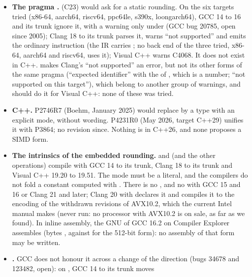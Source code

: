 \begin{itemize}
\item[$\bullet$] \textbf{The pragma .}
 (C23) would ask for a static rounding. On
the six targets tried (x86-64, aarch64, riscv64, ppc64le, s390x,
loongarch64), GCC 14 to 16 and its trunk ignore it, with a warning only
under  (GCC bug 20785, open since 2005); Clang 18 to its trunk
parses it, warns ``not supported'' and emits the ordinary instruction (the
IR carries ; no back end of the three tried, x86-64,
aarch64 and riscv64, uses it); Visual C++ warns C4068. It does not exist in
C++.  makes Clang's ``not supported'' an
error, but not its other forms of the same pragma (``expected identifier''
with the  of , which is a number; ``not
supported on this target''), which belong to another group of warnings, and
 should do it for Visual C++: none of these was tried.
\item[$\bullet$] \textbf{C++.} P2746R7 (Boehm, January 2025) would replace
 by a type with an explicit mode, without wording. P4231R0
(May 2026, target C++29) unifies it with P3864; no revision since. Nothing
is in C++26, and none proposes a SIMD form.
\item[$\bullet$] \textbf{The intrinsics of the embedded rounding.}
 and  (and the
other operations) compile with GCC 14 to its trunk, Clang 18 to its trunk
and Visual C++ 19.20 to 19.51. The mode must be a literal, and the compilers
do not fold a constant computed with . There is no
, and no  with GCC
15 and 16 or Clang 21 and later; Clang 20 with  declares
it and compiles it to the encoding of the withdrawn revisions of AVX10.2,
which the current Intel manual makes  (never run: no processor
with AVX10.2 is on sale, as far as we found). In inline assembly, the GNU
 of GCC 16.2 on Compiler Explorer assembles
 (bytes
, against  for the 512-bit
form): no assembly of that form may be written.
\item[$\bullet$] \textbf{.} GCC does not honour it
across a change of the direction (bugs 34678 and 123482, open): on
, GCC 14 to its trunk moves

\end{itemize}
